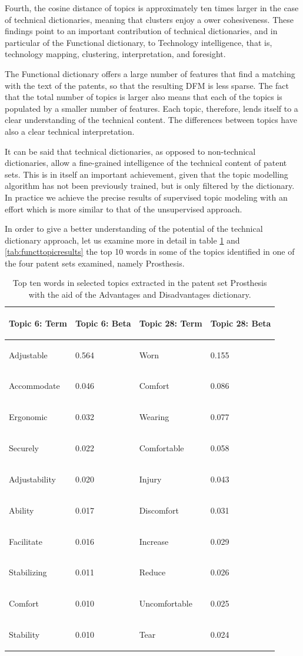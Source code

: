 \documentclass[]{book}
\begin{document}
Fourth, the cosine distance of topics is approximately ten times larger
in the case of technical dictionaries, meaning that clusters enjoy a
ower cohesiveness. These findings point to an important contribution of
technical dictionaries, and in particular of the Functional dictionary,
to Technology intelligence, that is, technology mapping, clustering,
interpretation, and foresight.

The Functional dictionary offers a large number of features that find a
matching with the text of the patents, so that the resulting DFM is less
sparse. The fact that the total number of topics is larger also means
that each of the topics is populated by a smaller number of features.
Each topic, therefore, lends itself to a clear understanding of the
technical content. The differences between topics have also a clear
technical interpretation.

It can be said that technical dictionaries, as opposed to non-technical
dictionaries, allow a fine-grained intelligence of the technical content
of patent sets. This is in itself an important achievement, given that
the topic modelling algorithm has not been previously trained, but is
only filtered by the dictionary. In practice we achieve the precise
results of supervised topic modeling with an effort which is more
similar to that of the unsupervised approach.

In order to give a better understanding of the potential of the
technical dictionary approach, let us examine more in detail in table
\ref{tab:advtopicresults} and \ref{tab:functtopicresults} the top 10
words in some of the topics identified in one of the four patent sets
examined, namely Prosthesis.

\begin{table}

\caption{\label{tab:advtopicresults}Top ten words in selected topics extracted in the patent set Prosthesis with the aid of the Advantages and Disadvantages dictionary.}
\centering
\begin{tabular}[t]{>{\em\raggedright\arraybackslash}p{10em}l>{\em\raggedright\arraybackslash}p{10em}l}
\toprule
Topic 6: Term & Topic 6: Beta & Topic 28: Term & Topic 28: Beta\\
\midrule
Adjustable & 0.564 & Worn & 0.155\\
Accommodate & 0.046 & Comfort & 0.086\\
Ergonomic & 0.032 & Wearing & 0.077\\
Securely & 0.022 & Comfortable & 0.058\\
Adjustability & 0.020 & Injury & 0.043\\
\addlinespace
Ability & 0.017 & Discomfort & 0.031\\
Facilitate & 0.016 & Increase & 0.029\\
Stabilizing & 0.011 & Reduce & 0.026\\
Comfort & 0.010 & Uncomfortable & 0.025\\
Stability & 0.010 & Tear & 0.024\\
\bottomrule
\end{tabular}
\end{table}
\end{document}

